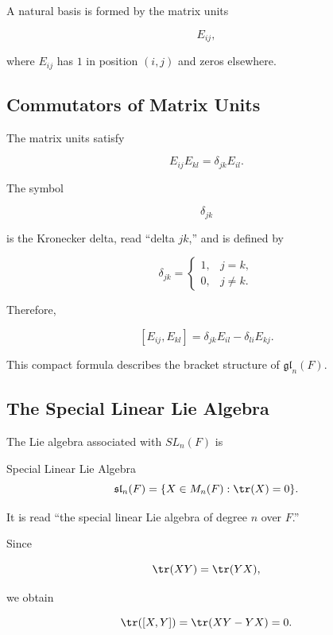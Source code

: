 A natural basis is formed by the matrix units

\[ E_{ij}, \]

where \(E_{ij}\) has \(1\) in position \((i,j)\) and zeros elsewhere.

\subsection{Commutators of Matrix Units}
\label{subsec:matrix-unit-commutators}

The matrix units satisfy

\[ E_{ij}E_{kl}=\delta_{jk}E_{il}. \]

The symbol

\[ \delta_{jk} \]

is the Kronecker delta, read ``delta \(j k\),'' and is defined by

\[ \delta_{jk}=
\begin{cases}
1,&j=k,\\
0,&j\neq k.
\end{cases} \]

Therefore,

\[ \boxed{[E_{ij},E_{kl}]
=\delta_{jk}E_{il}-\delta_{li}E_{kj}.} \]

This compact formula describes the bracket structure of
\(\mathfrak{gl}_n(F)\).

\subsection{The Special Linear Lie Algebra}
\label{subsec:special-linear-lie-algebra}

The Lie algebra associated with \(SL_n(F)\) is

\begin{definitionbox}{Special Linear Lie Algebra}
\[ \mathfrak{sl}_n(F)=\{X\in M_n(F):\tr(X)=0\}. \]
\end{definitionbox}

It is read ``the special linear Lie algebra of degree \(n\) over \(F\).''

Since

\[ \tr(XY)=\tr(YX), \]

we obtain

\[ \tr([X,Y])=\tr(XY-YX)=0. \]

